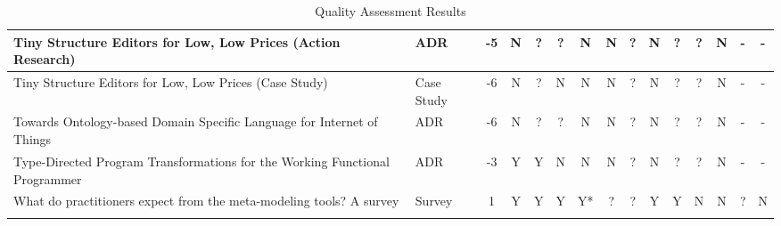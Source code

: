 \begin{landscape}
\begin{longtable}{ | p{11cm} | l | *{13}{c|} }
        Tiny Structure Editors for Low, Low Prices (Action Research)\cite{hempel2020tiny_SLR}                                                                                  & ADR               &  -5   & N & ? & ? & N & N & ? & N & ? & ? & N  & - & - \\\hline
        Tiny Structure Editors for Low, Low Prices (Case Study)\cite{hempel2020tiny_SLR}                                                                                       & Case Study        &  -6   & N & ? & N & N & N & ? & N & ? & ? & N  & - & - \\\hline
        Towards Ontology-based Domain Specific Language for Internet of Things\cite{negm2020towards_SLR}                                                                       & ADR               &  -6   & N & ? & ? & N & N & ? & N & ? & ? & N  & - & - \\\hline
        Type-Directed Program Transformations for the Working Functional Programmer\cite{lubin2020type_SLR}                                                                    & ADR               &  -3   & Y & Y & N & N & N & ? & N & ? & ? & N  & - & - \\\hline
        What do practitioners expect from the meta-modeling tools? A survey\cite{ozkaya2021practitioners_SLR}                                                                  & Survey            &  1    & Y & Y & Y & Y* & ? & ? & Y & Y & N & N  & ? & N \\\hline
        \caption{Quality Assessment Results}
        \label{table:QA_Results}
    \end{longtable}
\end{landscape}





